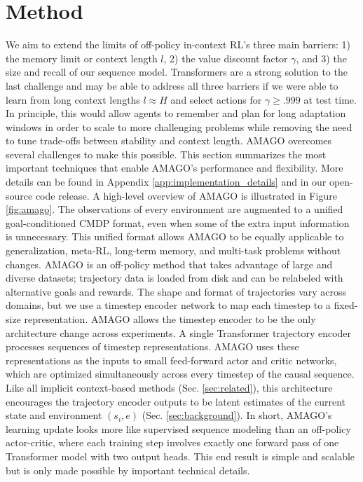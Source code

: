 \documentclass{article}
\begin{document}
\section{Method}
\label{sec:method}
We aim to extend the limits of off-policy in-context RL's three main barriers: 1) the memory limit or context length $l$, 2) the value discount factor $\gamma$, and 3) the size and recall of our sequence model. Transformers are a strong solution to the last challenge and may be able to address all three barriers if we were able to learn from long context lengths $l \approx H$ and select actions for $\gamma \geq .999$ at test time. In principle, this would allow agents to remember and plan for long adaptation windows in order to scale to more challenging problems while removing the need to tune trade-offs between stability and context length. AMAGO overcomes several challenges to make this possible. This section summarizes the most important techniques that enable AMAGO's performance and flexibility. More details can be found in Appendix \ref{app:implementation_details} and in our open-source code release.
A high-level overview of AMAGO is illustrated in Figure \ref{fig:amago}. The observations of every environment are augmented to a unified goal-conditioned CMDP format, even when some of the extra input information is unnecessary. This unified format allows AMAGO to be equally applicable to generalization, meta-RL, long-term memory, and multi-task problems without changes. AMAGO is an off-policy method that takes advantage of large and diverse datasets; trajectory data is loaded from disk and can be relabeled with alternative goals and rewards. The shape and format of trajectories vary across domains, but we use a timestep encoder network to map each timestep to a fixed-size representation. AMAGO allows the timestep encoder to be the only architecture change across experiments. A single Transformer trajectory encoder processes sequences of timestep representations. AMAGO uses these representations as the inputs to small feed-forward actor and critic networks, which are optimized simultaneously across every timestep of the causal sequence. Like all implicit context-based methods (Sec. \ref{sec:related}), this architecture encourages the trajectory encoder outputs to be latent estimates of the current state and environment $(s_i, e)$ (Sec. \ref{sec:background}). In short, AMAGO's learning update looks more like supervised sequence modeling than an off-policy actor-critic, where each training step involves exactly one forward pass of one Transformer model with two output heads. This end result is simple and scalable but is only made possible by important technical details.
\end{document}
